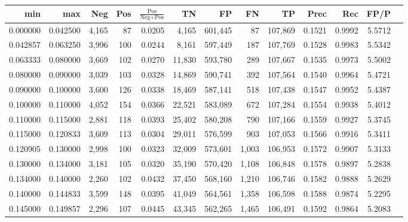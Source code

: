 \begin{tabular}{rrrrrrrrrrrrr}
\toprule
     min &      max &   Neg & Pos & $\frac{\text{Pos}}{\text{Neg}+\text{Pos}}$ &      TN &      FP &      FN &      TP &   Prec &    Rec &   FP/P \\
\midrule
0.000000 & 0.042500 & 4,165 &  87 &                                     0.0205 &   4,165 & 601,445 &      87 & 107,869 & 0.1521 & 0.9992 & 5.5712 \\
0.042857 & 0.063250 & 3,996 & 100 &                                     0.0244 &   8,161 & 597,449 &     187 & 107,769 & 0.1528 & 0.9983 & 5.5342 \\
0.063333 & 0.080000 & 3,669 & 102 &                                     0.0270 &  11,830 & 593,780 &     289 & 107,667 & 0.1535 & 0.9973 & 5.5002 \\
0.080000 & 0.090000 & 3,039 & 103 &                                     0.0328 &  14,869 & 590,741 &     392 & 107,564 & 0.1540 & 0.9964 & 5.4721 \\
0.090000 & 0.100000 & 3,600 & 126 &                                     0.0338 &  18,469 & 587,141 &     518 & 107,438 & 0.1547 & 0.9952 & 5.4387 \\
0.100000 & 0.110000 & 4,052 & 154 &                                     0.0366 &  22,521 & 583,089 &     672 & 107,284 & 0.1554 & 0.9938 & 5.4012 \\
0.110000 & 0.115000 & 2,881 & 118 &                                     0.0393 &  25,402 & 580,208 &     790 & 107,166 & 0.1559 & 0.9927 & 5.3745 \\
0.115000 & 0.120833 & 3,609 & 113 &                                     0.0304 &  29,011 & 576,599 &     903 & 107,053 & 0.1566 & 0.9916 & 5.3411 \\
0.120905 & 0.130000 & 2,998 & 100 &                                     0.0323 &  32,009 & 573,601 &   1,003 & 106,953 & 0.1572 & 0.9907 & 5.3133 \\
0.130000 & 0.134000 & 3,181 & 105 &                                     0.0320 &  35,190 & 570,420 &   1,108 & 106,848 & 0.1578 & 0.9897 & 5.2838 \\
0.134000 & 0.140000 & 2,260 & 102 &                                     0.0432 &  37,450 & 568,160 &   1,210 & 106,746 & 0.1582 & 0.9888 & 5.2629 \\
0.140000 & 0.144833 & 3,599 & 148 &                                     0.0395 &  41,049 & 564,561 &   1,358 & 106,598 & 0.1588 & 0.9874 & 5.2295 \\
0.145000 & 0.149857 & 2,296 & 107 &                                     0.0445 &  43,345 & 562,265 &   1,465 & 106,491 & 0.1592 & 0.9864 & 5.2083 \\

\end{tabular}
